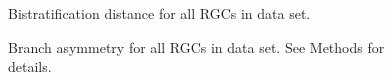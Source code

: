 \documentclass{article}
\begin{document}
\clearpage



\begin{figure}
  \centering
  \caption{Bistratification distance for all RGCs in data set.}
\end{figure}

\clearpage


\begin{figure}
  \centering
  \caption{Branch asymmetry for all RGCs in data set. See Methods for details.}
\end{figure}
\end{document}
